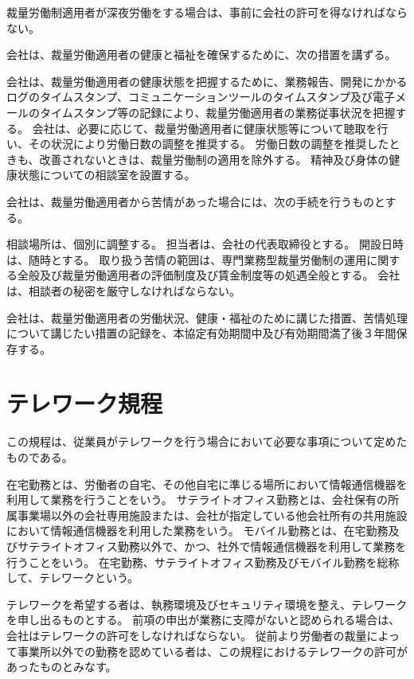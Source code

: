 \documentclass[10pt,a4paper,uplatex]{jsarticle}
\begin{document}
裁量労働制適用者が深夜労働をする場合は、事前に会社の許可を得なければならない。

会社は、裁量労働適用者の健康と福祉を確保するために、次の措置を講ずる。
\begin{enumerate}
    \itm 会社は、裁量労働適用者の健康状態を把握するために、業務報告、開発にかかるログのタイムスタンプ、コミュニケーションツールのタイムスタンプ及び電子メールのタイムスタンプ等の記録により、裁量労働適用者の業務従事状況を把握する。
    \itm 会社は、必要に応じて、裁量労働適用者に健康状態等について聴取を行い、その状況により労働日数の調整を推奨する。
    \itm 労働日数の調整を推奨したときも、改善されないときは、裁量労働制の適用を除外する。
    \itm 精神及び身体の健康状態についての相談室を設置する。
\end{enumerate}

会社は、裁量労働適用者から苦情があった場合には、次の手続を行うものとする。
\begin{enumerate}
    \itm 相談場所は、個別に調整する。
    \itm 担当者は、会社の代表取締役とする。
    \itm 開設日時は、随時とする。
    \itm 取り扱う苦情の範囲は、専門業務型裁量労働制の運用に関する全般及び裁量労働適用者の評価制度及び賃金制度等の処遇全般とする。
    \itm 会社は、相談者の秘密を厳守しなければならない。
\end{enumerate}

会社は、裁量労働適用者の労働状況、健康・福祉のために講じた措置、苦情処理について講じたい措置の記録を、本協定有効期間中及び有効期間満了後３年間保存する。

\clearpage
\section{テレワーク規程}

この規程は、従業員がテレワークを行う場合において必要な事項について定めたものである。

在宅勤務とは、労働者の自宅、その他自宅に準じる場所において情報通信機器を利用して業務を行うことをいう。
\term サテライトオフィス勤務とは、会社保有の所属事業場以外の会社専用施設または、会社が指定している他会社所有の共用施設において情報通信機器を利用した業務をいう。
\term モバイル勤務とは、在宅勤務及びサテライトオフィス勤務以外で、かつ、社外で情報通信機器を利用して業務を行うことをいう。
\term 在宅勤務、サテライトオフィス勤務及びモバイル勤務を総称して、テレワークという。

テレワークを希望する者は、執務環境及びセキュリティ環境を整え、テレワークを申し出るものとする。
\term 前項の申出が業務に支障がないと認められる場合は、会社はテレワークの許可をしなければならない。
\term 従前より労働者の裁量によって事業所以外での勤務を認めている者は、この規程におけるテレワークの許可があったものとみなす。
\end{document}
